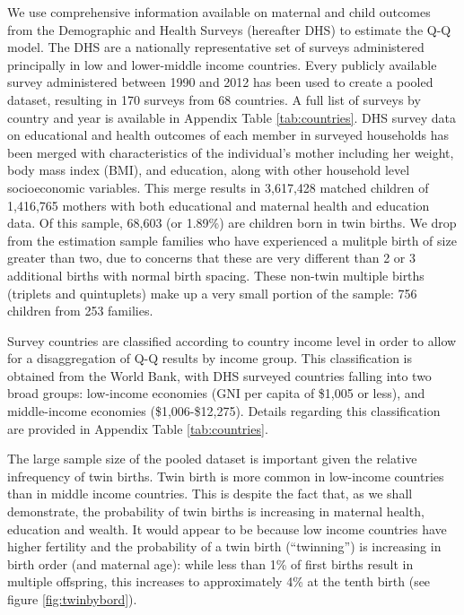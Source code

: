 \documentclass{article}[12pt,subeqn]
\begin{document}
\begin{spacing}{1.5}
We use comprehensive information available on maternal and child outcomes from the Demographic and Health Surveys (hereafter DHS) to estimate the Q-Q model. The DHS are a nationally representative set of surveys administered principally in low and lower-middle income countries. Every publicly available survey administered between 1990 and 2012 has been used to create a pooled dataset, resulting in 170 surveys from 68 countries. A full list of surveys by country and year is available in Appendix Table \ref{tab:countries}. DHS survey data on educational and health outcomes of each member in surveyed households has been merged with characteristics of the individual’s mother including her weight, body mass index (BMI), and education, along with other household level socioeconomic variables. This merge results in 3,617,428 matched children of 1,416,765 mothers with both educational and maternal health and education data. Of this sample, 68,603 (or 1.89\%)  are children born in twin births. We drop from the estimation sample families who have experienced a mulitple birth of size greater than two, due to concerns that these are very different than 2 or 3 additional births with normal birth spacing.  These non-twin multiple births (triplets and quintuplets) make up a very small portion of the sample: 756 children from 253 families.   %

Survey countries are classified according to country income level in order to allow for a disaggregation of Q-Q results by income group. This classification is obtained from the World Bank, with DHS surveyed countries falling into two broad groups: low-income economies (GNI per capita of \$1,005 or less), and middle-income economies (\$1,006-\$12,275). Details regarding this classification are provided in Appendix Table \ref{tab:countries}. 

The large sample size of the pooled dataset is important given the relative infrequency of twin births.  Twin birth is more common in low-income countries than in middle income countries.  This is despite the fact that, as we shall demonstrate, the probability of twin births is increasing in maternal health, education and wealth. It would appear to be because low income countries have higher fertility and the probability of a twin birth (``twinning'') is increasing in birth order (and maternal age): while less than 1\% of first births result in multiple offspring, this increases to approximately 4\% at the tenth birth (see figure \ref{fig:twinbybord}). 


\end{spacing}
\end{document}
